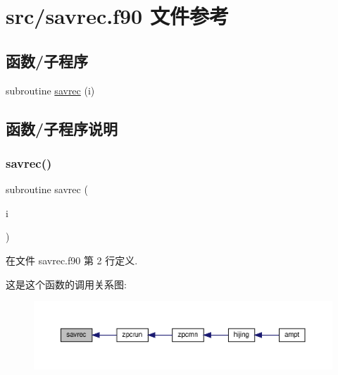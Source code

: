 \hypertarget{savrec_8f90}{}\section{src/savrec.f90 文件参考}
\label{savrec_8f90}
\subsection*{函数/子程序}
\begin{DoxyCompactItemize}
\item 
subroutine \mbox{\hyperlink{savrec_8f90_a5034914dcb7bf2befd3294bf84c2e335}{savrec}} (i)
\end{DoxyCompactItemize}


\subsection{函数/子程序说明}
\mbox{\label{savrec_8f90_a5034914dcb7bf2befd3294bf84c2e335}} 
\subsubsection{\texorpdfstring{savrec()}{savrec()}}
{\footnotesize\ttfamily subroutine savrec (\begin{DoxyParamCaption}\item[{}]{i }\end{DoxyParamCaption})}



在文件 savrec.\+f90 第 2 行定义.

这是这个函数的调用关系图\+:
\nopagebreak
\begin{figure}[H]
\begin{center}
\leavevmode
\includegraphics[width=350pt]{savrec_8f90_a5034914dcb7bf2befd3294bf84c2e335_icgraph}
\end{center}
\end{figure}
